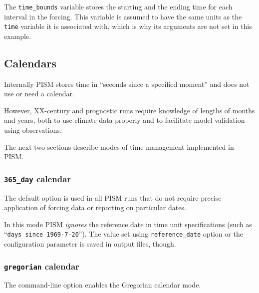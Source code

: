\documentclass[titlepage,letterpaper,final]{scrartcl}
\begin{document}
The \texttt{time_bounds} variable stores the starting and the ending time for
each interval in the forcing. This variable is assumed to have the same units
as the \texttt{time} variable it is associated with, which is why its arguments
are not set in this example.

\subsection{Calendars}
\label{sec:calendars}

Internally PISM stores time in ``seconds since a specified moment'' and
does not use or need a calendar.

However, XX-century and prognostic runs require knowledge of lengths of months
and years, both to use climate data properly and to facilitate model validation
using observations.

The next two sections describe modes of time management implemented in PISM.

\subsubsection{\texttt{365_day} calendar}
\label{sec:365-day}

The default  option is used in all PISM
runs that do not require precise application of forcing data or reporting on
particular dates.

In this mode PISM \emph{ignores} the reference date in time unit specifications
(such as ``\texttt{days since 1969-7-20}''). The value set using
\texttt{reference_date} option or the configuration parameter is saved in
output files, though.

\subsubsection{\texttt{gregorian} calendar}
\label{sec:gregorian}

The command-line option  enables the Gregorian
calendar mode.
\end{document}
